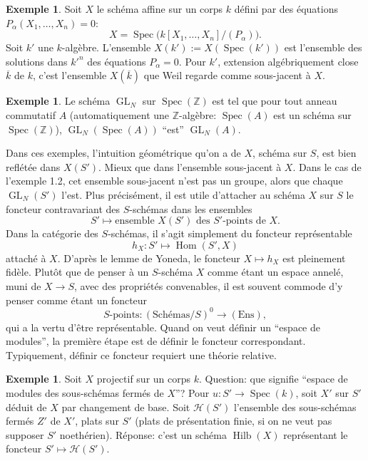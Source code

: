\documentclass[11pt,a4paper]{article}
\theoremstyle{plain}
\theoremstyle{definition}
\newtheorem{example}[theorem]{Exemple}
\DeclareMathOperator{\Spec}{Spec}
\DeclareMathOperator{\Hom}{Hom}
\DeclareMathOperator{\Hilb}{Hilb}
\DeclareMathOperator{\GL}{GL}
\begin{document}
\begin{example}
Soit $X$ le sch\'ema affine sur un corps $k$ d\'efini par des \'equations $P_\alpha(X_1,\ldots,X_n) = 0$:
\[
X = \Spec\bigl(k[X_1,\ldots,X_n]/(P_\alpha)\bigr).
\]
Soit $k'$ une $k$-alg\`ebre. L'ensemble $X(k') := X(\Spec(k'))$ est l'ensemble des solutions dans $k'^n$ des \'equations $P_\alpha = 0$. Pour $k'$, extension alg\'ebriquement close $\overline{k}$ de $k$, c'est l'ensemble $X(\overline{k})$ que Weil regarde comme sous-jacent \`a $X$.
\end{example}

\begin{example}
Le sch\'ema $\GL_N$ sur $\Spec(\mathbb{Z})$ est tel que pour tout anneau commutatif $A$ (automatiquement une $\mathbb{Z}$-alg\`ebre: $\Spec(A)$ est un sch\'ema sur $\Spec(\mathbb{Z})$), $\GL_N(\Spec(A))$ ``est'' $\GL_N(A)$.
\end{example}

Dans ces exemples, l'intuition g\'eom\'etrique qu'on a de $X$, sch\'ema sur $S$, est bien refl\'et\'ee dans $X(S')$. Mieux que dans l'ensemble sous-jacent \`a $X$. Dans le cas de l'exemple 1.2, cet ensemble sous-jacent n'est pas un groupe, alors que chaque $\GL_N(S')$ l'est. Plus pr\'ecis\'ement, il est utile d'attacher au sch\'ema $X$ sur $S$ le foncteur contravariant des $S$-sch\'emas dans les ensembles
\[
S' \longmapsto \text{ensemble } X(S') \text{ des } S'\text{-points de } X.
\]
Dans la cat\'egorie des $S$-sch\'emas, il s'agit simplement du foncteur repr\'esentable
\[
h_X \colon S' \longmapsto \Hom(S', X)
\]
attach\'e \`a $X$. D'apr\`es le lemme de Yoneda, le foncteur $X \mapsto h_X$ est pleinement fid\`ele. Plut\^ot que de penser \`a un $S$-sch\'ema $X$ comme \'etant un espace annel\'e, muni de $X \to S$, avec des propri\'et\'es convenables, il est souvent commode d'y penser comme \'etant un foncteur
\[
S\text{-points} \colon (\text{Sch\'emas}/S)^0 \longrightarrow (\text{Ens}),
\]
qui a la vertu d'\^etre repr\'esentable. Quand on veut d\'efinir un ``espace de modules'', la premi\`ere \'etape est de d\'efinir le foncteur correspondant. Typiquement, d\'efinir ce foncteur requiert une th\'eorie relative.

\begin{example}
Soit $X$ projectif sur un corps $k$. Question: que signifie ``espace de modules des sous-sch\'emas ferm\'es de $X$''? Pour $u \colon S' \to \Spec(k)$, soit $X'$ sur $S'$ d\'eduit de $X$ par changement de base. Soit $\mathcal{H}(S')$ l'ensemble des sous-sch\'emas ferm\'es $Z'$ de $X'$, plats sur $S'$ (plats de pr\'esentation finie, si on ne veut pas supposer $S'$ noeth\'erien). R\'eponse: c'est un sch\'ema $\Hilb(X)$ repr\'esentant le foncteur $S' \mapsto \mathcal{H}(S')$.
\end{example}
\end{document}
